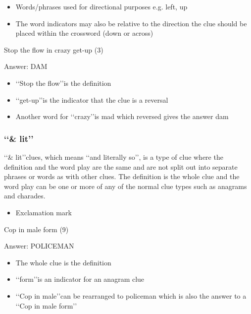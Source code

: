 \begin{itemize}
	\item Words/phrases used for directional purposes e.g. left, up 
	\item The word indicators may also be relative to the direction the clue should be placed within the crossword (down or across) 
\end{itemize}


Stop the flow in crazy get-up (3) 

Answer: DAM 

\begin{itemize}
	\item \lq\lq Stop the flow\rq\rq is the definition 
	\item \lq\lq get-up\rq\rq is the indicator that the clue is a reversal 
	\item Another word for \lq\lq crazy\rq\rq is mad which reversed gives the answer dam 
\end{itemize}

\subsubsection{\lq\lq \& lit\rq\rq}

\lq\lq \& lit\rq\rq clues, which means \lq\lq and literally so\rq\rq, is a type of clue where the definition and the word play are the same and are not split out into separate phrases or words as with other clues. The definition is the whole clue and the word play can be one or more of any of the normal clue types such as anagrams and charades. 

\begin{itemize} 
	\item Exclamation mark
\end{itemize}


Cop in male form (9)  

Answer: POLICEMAN 

\begin{itemize}
	\item The whole clue is the definition 
	\item \lq\lq form\rq\rq is an indicator for an anagram clue 
	\item \lq\lq Cop in male\rq\rq can be rearranged to policeman which is also the answer to a \lq\lq Cop in male form\rq\rq 
\end{itemize}

